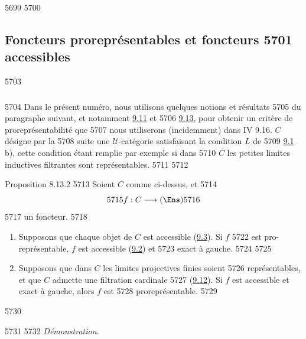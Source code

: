   5699	
  5700	\subsection{Foncteurs proreprésentables et foncteurs
  5701	  accessibles}	
  5703	\subsubsection{}
  5704	Dans le présent numéro, nous utilisons quelques notions et résultats
  5705	du paragraphe suivant, et notamment \hyperref[I.prop9.11]{9.11} et
  5706	\hyperref[I.prop9.13]{9.13}, pour obtenir un critère de proreprésentabilité que
  5707	nous utiliserons (incidemment) dans IV 9.16. $C$ désigne par la
  5708	suite une $𝒰$-catégorie satisfaisant la condition $L$ de
  5709	\hyperref[I.def9.1]{9.1} b), cette condition étant remplie par exemple si dans
  5710	$C$ les petites limites inductives filtrantes sont représentables.
  5711	
  5712	\begin{enonce*}{Proposition 8.13.2}
  5713	Soient $C$ comme ci-dessus, et
  5714	$$
  5715	f:C\longrightarrow(\Ens)
  5716	$$
  5717	un foncteur.
  5718	\begin{enumerate}
  5719	\renewcommand{\theenumi}{\alph{enumi}}
  5720	\renewcommand{\labelenumi}{\theenumi)}
  5721	\item Supposons que chaque objet de $C$ est accessible (\hyperref[I.def9.3]{9.3}). Si $f$
  5722	est pro-représentable, $f$ est accessible (\hyperref[I.def9.2]{9.2}) et
  5723	exact à gauche.
  5724	
  5725	\item Supposons que dans $C$ les limites projectives finies soient
  5726	représentables, et que $C$ admette une filtration cardinale
  5727	(\hyperref[I.def9.12]{9.12}). Si $f$ est accessible et exact à gauche, alors $f$ est
  5728	proreprésentable.
  5729	\end{enumerate}
  5730	\end{enonce*}
  5731	
  5732	\noindent \emph{Démonstration.}
